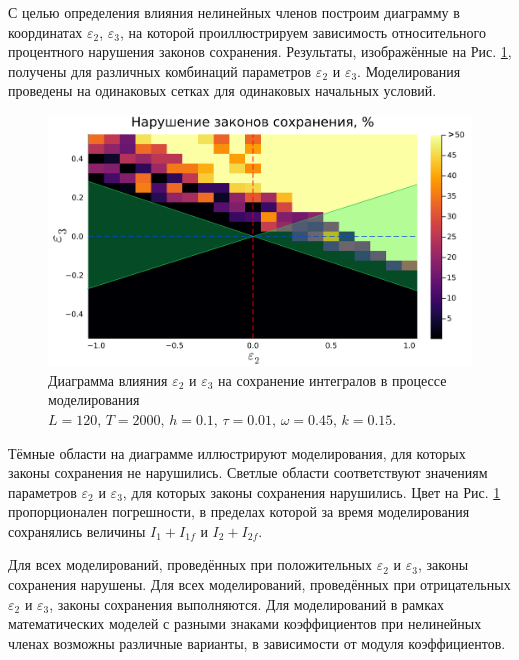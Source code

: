 \documentclass[14pt,a4paper]{extreport}
\begin{document}
			С целью определения влияния нелинейных членов построим диаграмму в координатах \(\varepsilon_{2}\), \(\varepsilon_{3}\), на которой проиллюстрируем зависимость относительного процентного нарушения законов сохранения. Результаты, изображённые на Рис. \ref{fig340-11}, получены для различных комбинаций параметров \(\varepsilon_{2}\) и \(\varepsilon_{3}\). Моделирования проведены на одинаковых сетках для одинаковых начальных условий.

			\begin{figure}[H]
				\begin{center}
					\includegraphics[width=0.7\linewidth]{fig85.png}
				\end{center}
				\caption{Диаграмма влияния \(\varepsilon_{2}\) и \(\varepsilon_{3}\) на сохранение интегралов в процессе моделирования
				\(L=120,\, T=2000,\, h=0.1,\, \tau=0.01,\, \omega=0.45,\, k=0.15\).}
				\label{fig340-11}
			\end{figure}

			Тёмные области на диаграмме иллюстрируют моделирования, для которых законы сохранения не нарушились. Светлые области соответствуют значениям параметров \(\varepsilon_{2}\) и \(\varepsilon_{3}\), для которых законы сохранения нарушились. Цвет на Рис. \ref{fig340-11} пропорционален погрешности, в пределах которой за время моделирования сохранялись величины \(I_{1}+I_{1f}\) и \(I_{2}+I_{2f}\).

			Для всех моделирований, проведённых при положительных \(\varepsilon_{2}\) и \(\varepsilon_{3}\), законы сохранения нарушены. Для всех моделирований, проведённых при отрицательных \(\varepsilon_{2}\) и \(\varepsilon_{3}\), законы сохранения выполняются. Для моделирований в рамках математических моделей с разными знаками коэффициентов при нелинейных членах возможны различные варианты, в зависимости от модуля коэффициентов.
\end{document}
